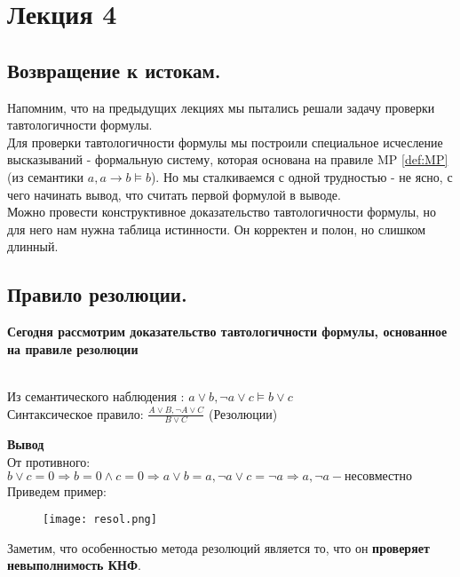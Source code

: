 \section{Лекция 4}
\subsection{Возвращение к истокам.}
Напомним, что на предыдущих лекциях мы пытались решали задачу проверки тавтологичности формулы.\\
Для проверки тавтологичности формулы мы построили специальное исчесление высказываний - формальную систему, которая основана на правиле MP \ref{def:MP} (из семантики $a,a\to b \vDash b$). Но мы сталкиваемся с одной трудностью - не ясно, с чего начинать вывод, что считать первой формулой в выводе.\\
Можно провести конструктивное доказательство тавтологичности формулы, но для него нам нужна таблица истинности. Он корректен и полон, но слишком длинный.\\
\subsection{Правило резолюции.}
\textbf{Сегодня рассмотрим доказательство тавтологичности формулы, основанное на правиле резолюции}\\
\begin{definition} \label{def:resolution} \\
Из семантического наблюдения : $a\vee b, \neg a\vee c \vDash b\vee c$\\
Синтаксическое правило: $\frac{A\vee B,\neg A\vee C }{B\vee C}$
(Резолюции)
\end{definition}
\textbf{Вывод}\\
От противного: $b\vee c=0\Rightarrow b=0 \wedge c=0\Rightarrow a\vee b=a, \neg a\vee c=\neg a\Rightarrow a, \neg a - \text{несовместно}$\\
Приведем пример:\\
\begin{figure}[!h]
	\texttt{[image: resol.png]}
\end{figure}
\newline
Заметим, что особенностью метода резолюций является то, что он \textbf{проверяет невыполнимость КНФ}.
